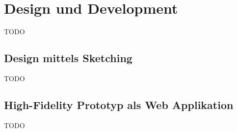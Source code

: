 \section{Design und Development}
TODO

\subsection{Design mittels Sketching}
TODO

\subsection{High-Fidelity Prototyp als Web Applikation}
TODO